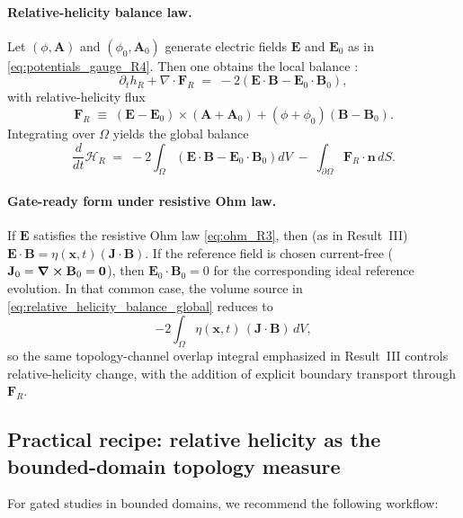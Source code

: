 \documentclass[11pt]{article}
\theoremstyle{plain}
\theoremstyle{definition}
\theoremstyle{remark}
\newcommand{\diver}{\nabla\cdot}
\newcommand{\A}{\mathbf{A}}
\newcommand{\B}{\mathbf{B}}
\newcommand{\E}{\mathbf{E}}
\newcommand{\J}{\mathbf{J}}
\begin{document}
\paragraph{Relative-helicity balance law.}
Let $(\phi,\A)$ and $(\phi_0,\A_0)$ generate electric fields $\E$ and $\E_0$ as in
\eqref{eq:potentials_gauge_R4}. Then one obtains the local balance \cite{FinnAntonsen1985}:
\begin{equation}\label{eq:relative_helicity_balance_local}
  \partial_t h_R + \diver \mathbf{F}_R
  \;=\;
  -2\left(\E\cdot\B - \E_0\cdot\B_0\right),
\end{equation}
with relative-helicity flux
\begin{equation}\label{eq:relative_helicity_flux}
  \mathbf{F}_R
  \;\equiv\;
  (\E-\E_0)\times(\A+\A_0) + (\phi+\phi_0)(\B-\B_0).
\end{equation}
Integrating over $\Omega$ yields the global balance
\begin{equation}\label{eq:relative_helicity_balance_global}
  \frac{d}{dt}\mathcal{H}_R
  \;=\;
  -2\int_{\Omega}\left(\E\cdot\B - \E_0\cdot\B_0\right)dV
  \;-\;
  \int_{\partial\Omega}\mathbf{F}_R\cdot\mathbf{n}\,dS.
\end{equation}

\paragraph{Gate-ready form under resistive Ohm law.}
If $\E$ satisfies the resistive Ohm law \eqref{eq:ohm_R3}, then (as in Result~III)
$\E\cdot\B = \eta(\mathbf{x},t)(\J\cdot\B)$. If the reference field is chosen current-free
($\J_0=\curl\B_0=\mathbf{0}$), then $\E_0\cdot\B_0=0$ for the corresponding ideal reference evolution.
In that common case, the volume source in \eqref{eq:relative_helicity_balance_global} reduces to
\begin{equation}\label{eq:relative_helicity_gate_source}
  -2\int_{\Omega}\eta(\mathbf{x},t)\,(\J\cdot\B)\,dV,
\end{equation}
so the same topology-channel overlap integral emphasized in Result~III controls relative-helicity change,
with the addition of explicit boundary transport through $\mathbf{F}_R$.

\subsection{Practical recipe: relative helicity as the bounded-domain topology measure}\label{sec:result_gauge_recipe}
For gated studies in bounded domains, we recommend the following workflow:
\end{document}
